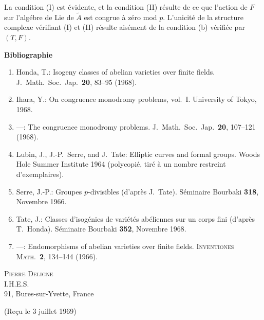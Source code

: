 \documentclass[10pt]{amsart}
\theoremstyle{plain}
\theoremstyle{remark}
\begin{document}
La condition (I) est \'evidente, et la condition (II) r\'esulte de ce
que l'action de $F$ sur l'alg\'ebre de Lie de $\tilde{A}$ est congrue
\`a z\'ero mod $p$. L'unicit\'e de la structure complexe v\'erifiant
(I) et (II) r\'esulte ais\'ement de la condition (b) v\'erifi\'ee
par $(T, F)$.

\bigskip
\begin{center}
\textbf{Bibliographie}
\end{center}
\begin{enumerate}
\item[{[1]}] Honda, T.: Isogeny classes of abelian varieties over finite
fields. J.\ Math.\ Soc.\ Jap.\ \textbf{20}, 83--95 (1968).
\item[{[2]}] Ihara, Y.: On congruence monodromy problems, vol.~I.
University of Tokyo, 1968.
\item[{[3]}] ---: The congruence monodromy problems. J.\ Math.\ Soc.\
Jap.\ \textbf{20}, 107--121 (1968).
\item[{[4]}] Lubin, J., J.-P.\ Serre, and J.\ Tate: Elliptic curves and
formal groups. Woods Hole Summer Institute 1964 (polycopi\'e, tir\'e
\`a un nombre restreint d'exemplaires).
\item[{[5]}] Serre, J.-P.: Groupes $p$-divisibles (d'apr\`es J.\ Tate).
S\'eminaire Bourbaki \textbf{318}, Novembre 1966.
\item[{[6]}] Tate, J.: Classes d'isog\'enies de vari\'et\'es ab\'eliennes
sur un corps fini (d'apr\`es T.\ Honda). S\'eminaire Bourbaki
\textbf{352}, Novembre 1968.
\item[{[7]}] ---: Endomorphisms of abelian varieties over finite fields.
\textsc{Inventiones Math.}\ \textbf{2}, 134--144 (1966).
\end{enumerate}

\bigskip
\begin{flushright}
\textsc{Pierre Deligne}\\
I.H.E.S.\\
91, Bures-sur-Yvette, France
\end{flushright}

\smallskip
\begin{flushright}
(Re\c{c}u le 3 juillet 1969)
\end{flushright}
\end{document}

